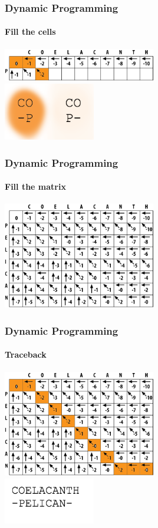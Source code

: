 \documentclass[table]{beamer}
\begin{document}
    \begin{frame}
     \frametitle{Dynamic Programming}
     \framesubtitle{Fill the cells}
       \begin{center}
         \includegraphics[width=0.5\textwidth]{images/fill_start} \\
         \includegraphics[width=0.3\textwidth]{images/fill_start_letters}
       \end{center}
    \end{frame}     

    \begin{frame}
     \frametitle{Dynamic Programming}
     \framesubtitle{Fill the matrix}
       \begin{center}
         \includegraphics[width=0.5\textwidth]{images/full_matrix}
       \end{center}
    \end{frame}  
   
    \begin{frame}
     \frametitle{Dynamic Programming}
     \framesubtitle{Traceback}
       \begin{center}
         \includegraphics[width=0.5\textwidth]{images/traceback} \\
         \includegraphics[width=0.3\textwidth]{images/traceback_sequence}         
       \end{center}
    \end{frame}     
\end{document}
